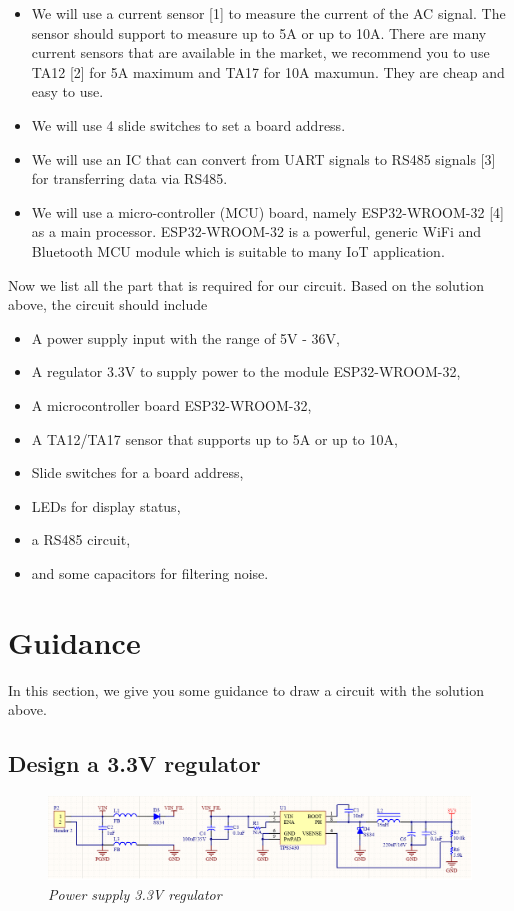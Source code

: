 \begin{itemize}
    \item We will use a current sensor [1] to measure the current of the AC signal. The sensor should support to measure up to 5A or up to 10A. There are many current sensors that are available in the market, we recommend you to use TA12 [2] for 5A maximum and TA17 for 10A maxumun. They are cheap and easy to use. 

    \item We will use 4 slide switches to set a board address. 
    
    \item We will use an IC that can convert from UART signals to RS485 signals [3] for transferring data via RS485.
    
    \item We will use a micro-controller (MCU) board, namely ESP32-WROOM-32 [4] as a main processor. ESP32-WROOM-32 is a powerful, generic WiFi and Bluetooth MCU module which is suitable to many IoT application. 

\end{itemize}

Now we list all the part that is required for our circuit. Based on the solution above, the circuit should include
\begin{itemize}
    \item A power supply input with the range of 5V - 36V,
    \item A regulator 3.3V to supply power to the module ESP32-WROOM-32,
    \item A microcontroller board ESP32-WROOM-32,
    \item A TA12/TA17 sensor that supports up to 5A or up to 10A,
    \item Slide switches for a board address,
    \item LEDs for display status,
    \item a RS485 circuit,
    \item and some capacitors for filtering noise.
\end{itemize}

\section{Guidance}
In this section, we give you some guidance to draw a circuit with the solution above. 

\subsection{Design a 3.3V regulator}
\begin{figure}[!htp]
    \centering
    \includegraphics[width=6in]{source/picture/bai_7/bai7_power_supply.png}
    \caption{\textit{Power supply 3.3V regulator}}
    \label{bai7_power_supply}
\end{figure}

